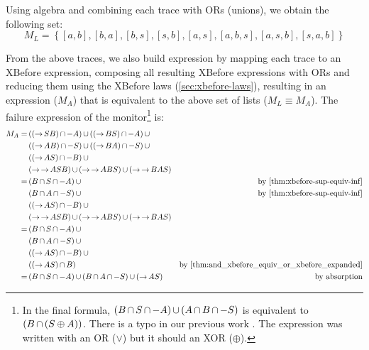 \documentclass[en,twoside,onehalfspacing,phd]{risethesis}
\def\xbeforeop{\ensuremath\rightarrow}
\newcommand{\xbefore}[2]{\ensuremath #1 \xbeforeop #2 }
\newcommand{\parsin}[1]{\ensuremath\left( #1 \right)}
\def\union{\ensuremath\operatorname{\cup}}
\def\inter{\ensuremath\operatorname{\cap}}
\def\xbefore{\ensuremath\operatorname{\rightarrow}}
\begin{document}
Using \ac{algebra} and combining each trace with ORs (unions), we obtain the following set:
%
\[
M_L =
  \left\{
    [a,b],[b,a],[b,s],[s,b],[a,s],
    [a,b,s],[a,s,b],[s,a,b]
  \right\}
\]

From the above traces, we also build  expression by mapping each trace to an XBefore expression, composing all resulting XBefore expressions with ORs and reducing them using the XBefore laws (\cref{sec:xbefore-laws}), resulting in an expression ($M_A$) that is equivalent to the above set of lists ($M_L \equiv M_A$).
The failure expression of the monitor\footnote{In the final formula, $\parsin{B \inter S \inter -A} \union \parsin{A \inter B \inter -S}$ is equivalent to $\parsin{B \inter \parsin{S \oplus A}}$. There is a typo in our previous work \cite{DM2015}. The expression was written with an OR ($\lor$) but it should an XOR ($\oplus$).} is:
%
\begin{align*}
M_A = & \parsin{\parsin{\xbefore{S}{B}} \inter -A} \union \parsin{\parsin{\xbefore{B}{S}} \inter -A} \union\\
  &\parsin{\parsin{\xbefore{A}{B}} \inter -S} \union \parsin{\parsin{\xbefore{B}{A}} \inter -S} \union\\
  & \parsin{\parsin{\xbefore{A}{S}} \inter -B} \union \\
  & \parsin{\xbefore{\xbefore{A}{S}}{B}} \union \parsin{\xbefore{\xbefore{A}{B}}{S}} \union \parsin{\xbefore{\xbefore{B}{A}}{S}} \\
= &\parsin{B \inter S \inter -A} \union & \text{by \eqref{thm:xbefore-sup-equiv-inf}}\\
  & \parsin{B \inter A \inter -S} \union & \text{by \eqref{thm:xbefore-sup-equiv-inf}}\\
  & \parsin{\parsin{\xbefore{A}{S}} \inter -B} \union\\
  & \parsin{\xbefore{\xbefore{A}{S}}{B}} \union \parsin{\xbefore{\xbefore{A}{B}}{S}} \union \parsin{\xbefore{\xbefore{B}{A}}{S}}\\
%
= &\parsin{B \inter S \inter -A} \union \\
  & \parsin{B \inter A \inter -S} \union \\
  & \parsin{\parsin{\xbefore{A}{S}} \inter -B} \union \\
  & \parsin{\parsin{\xbefore{A}{S}} \inter B} & \text{by \eqref{thm:and_xbefore_equiv_or_xbefore_expanded}}\\
%
= &\parsin{B \inter S \inter -A} \union \parsin{B \inter A \inter -S} \union \parsin{\xbefore{A}{S}} & \text{by absorption}
\end{align*}
\end{document}
